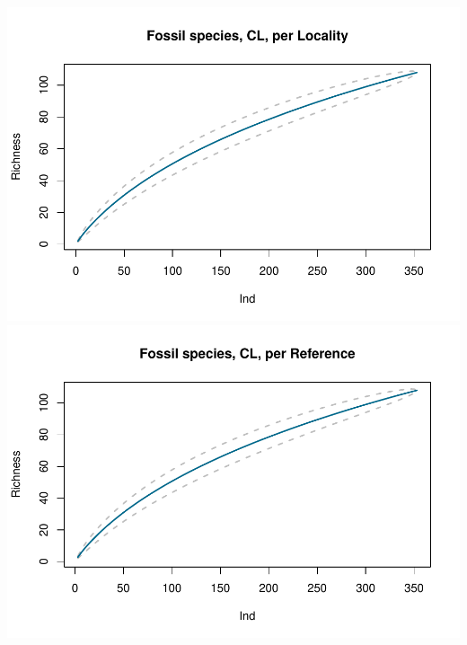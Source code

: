 \documentclass[]{article}
\begin{document}
\includegraphics{MA_JJ_files/figure-latex/Species Accumulation Curve-1.pdf}
\includegraphics{MA_JJ_files/figure-latex/Species Accumulation Curve-2.pdf}
\end{document}
